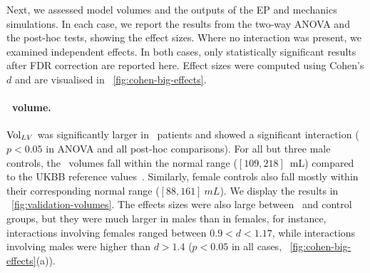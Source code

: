 

Next, we assessed model volumes and the outputs of the EP and mechanics simulations.
In each case, we report the results from the two-way ANOVA and the post-hoc tests, showing 
the effect sizes. 
Where no interaction was present, we examined independent effects.
In both cases, only statistically significant results after FDR correction are reported here.
Effect sizes were computed using Cohen’s $d$ and are visualised in 
~\ref{fig:cohen-big-effects}.

\paragraph{\LV\ volume.} 
$\mathrm{Vol}_{LV}$ was significantly larger in \HF\ patients and showed a significant interaction 
($p<0.05$ in ANOVA and all post-hoc comparisons).
For all but three male controls, the \LV\ volumes fall within the normal range 
($[109,218]$~mL)
compared to the UKBB reference values~\cite{petersen-2017-reference}.
Similarly, female controls also fall mostly within their corresponding normal range
($[88,161]~mL$).
We display the results in ~\ref{fig:validation-volumes}.
The effects sizes were also large between \HF\ and control groups, but they were much 
larger in males than in females, for instance, 
interactions involving females ranged between $0.9<d<1.17$, 
while interactions involving males were higher than $d>1.4$ 
($p<0.05$ in all cases, ~\ref{fig:cohen-big-effects}(a)).

